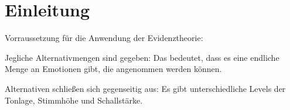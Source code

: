 \chapter{Einleitung}

Vorraussetzung für die Anwendung der Evidenztheorie:

Jegliche Alternativmengen sind gegeben: Das bedeutet, dass es eine endliche Menge an Emotionen gibt, die angenommen werden können.

Alternativen schließen sich gegenseitig aus: Es gibt unterschiedliche Levels der Tonlage, Stimmhöhe und Schallstärke. 